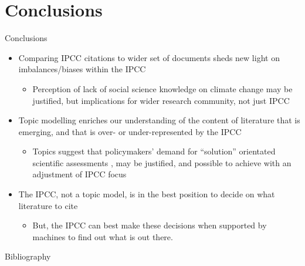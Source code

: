 \documentclass[9pt]{beamer}
\begin{document}
\section{Conclusions}

\begin{frame}{Conclusions}

\begin{itemize}
	\item<1-> Comparing IPCC citations to wider set of documents sheds new light on imbalances/biases within the IPCC
	\begin{itemize}
		\item Perception of lack of social science knowledge on climate change may be justified, but implications for wider research community, not just IPCC
	\end{itemize}
	\item<2-> Topic modelling enriches our understanding of the content of literature that is emerging, and that is over- or under-represented by the IPCC
	\begin{itemize}
		\item Topics suggest that policymakers' demand for ``solution'' orientated scientific assessments \citep{Kowarsch2017}, may be justified, and possible to achieve with an adjustment of IPCC focus
	\end{itemize}
	\item<3-> The IPCC, not a topic model, is in the best position to decide on what literature to cite
		\begin{itemize}
			\item But, the IPCC can best make these decisions when supported by machines to find out what is out there.
		\end{itemize}
\end{itemize}

\end{frame}


\begin{frame}{Bibliography}
\small

\end{frame}
\end{document}
